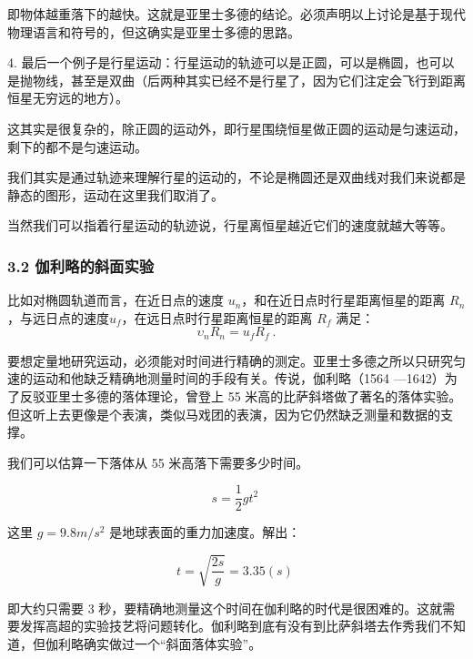 即物体越重落下的越快。这就是亚里⼠多德的结论。必须声明以上讨论是基于现代物理语⾔和符号的，但这确实是亚里⼠多德的思路。

4. 最后⼀个例⼦是⾏星运动：⾏星运动的轨迹可以是正圆，可以是椭圆，也可以是抛物线，甚⾄是双曲（后两种其实已经不是⾏星了，因为它们注定会飞⾏到距离恒星⽆穷远的地⽅）。

这其实是很复杂的，除正圆的运动外，即⾏星围绕恒星做正圆的运动是匀速运动，剩下的都不是匀速运动。

我们其实是通过轨迹来理解⾏星的运动的，不论是椭圆还是双曲线对我们来说都是静态的图形，运动在这里我们取消了。

当然我们可以指着⾏星运动的轨迹说，⾏星离恒星越近它们的速度就越⼤等等。

\subsubsection{3.2 伽利略的斜面实验}

比如对椭圆轨道⽽⾔，在近日点的速度 $u_n$，和在近日点时⾏星距离恒星的距离 $R_n$，与远日点的速度$u_f$，在远日点时⾏星距离恒星的距离 $R_f$ 满⾜：
\begin{equation}
\upsilon_nR_n = u_fR_f~.
\end{equation}

要想定量地研究运动，必须能对时间进⾏精确的测定。亚里⼠多德之所以只研究匀速的运动和他缺乏精确地测量时间的⼿段有关。传说，伽利略（1564 —1642）为了反驳亚里⼠多德的落体理论，曾登上 55 米⾼的比萨斜塔做了著名的落体实验。但这听上去更像是个表演，类似马戏团的表演，因为它仍然缺乏测量和数据的支撑。

我们可以估算⼀下落体从 55 米⾼落下需要多少时间。

\begin{equation}
s=\frac{1}{2}gt^2~
\end{equation}

这里 $g = 9.8m/s^2$ 是地球表面的重⼒加速度。解出：

\begin{equation}
t=\sqrt{\frac{2s}{g}}=3.35(s)~
\end{equation}

即⼤约只需要 3 秒，要精确地测量这个时间在伽利略的时代是很困难的。这就需要发挥⾼超的实验技艺将问题转化。伽利略到底有没有到比萨斜塔去作秀我们不知道，但伽利略确实做过⼀个“斜面落体实验”。

